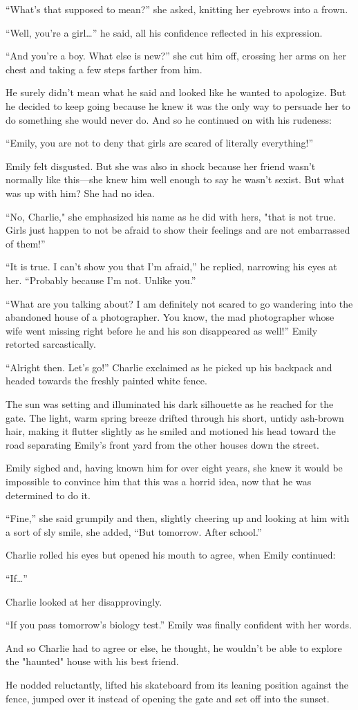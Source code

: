 “What’s that supposed to mean?” she asked, knitting her eyebrows into a frown.

“Well, you’re a girl…” he said, all his confidence reflected in his expression.

“And you’re a boy. What else is new?” she cut him off, crossing her arms on her chest and taking a few steps farther from him.

He surely didn’t mean what he said and looked like he wanted to apologize. But he decided to keep going because he knew
it was the only way to persuade her to do something she would never do. And so he continued on with his rudeness:

“Emily, you are not to deny that girls are scared of literally everything!”

Emily felt disgusted. But she was also in shock because her friend wasn’t normally like this—she knew him well enough to say he wasn’t sexist.
But what was up with him? She had no idea.

“No, Charlie," she emphasized his name as he did with hers, "that is not true. Girls just happen to not be afraid to show their feelings and are not
embarrassed of them!”

“It is true. I can’t show you that I’m afraid,” he replied, narrowing his eyes at her. “Probably because I’m not. Unlike you.”

“What are you talking about? I am definitely not scared to go wandering into the abandoned house of a photographer. You know, the mad photographer
whose wife went missing right before he and his son disappeared as well!” Emily retorted sarcastically.

“Alright then. Let’s go!” Charlie exclaimed as he picked up his backpack and headed towards the freshly painted white fence.

The sun was setting and illuminated his dark silhouette as he reached for the gate. The light, warm spring breeze drifted
through his short, untidy ash-brown hair, making it flutter slightly as he smiled and motioned his head toward the road
separating Emily’s front yard from the other houses down the street.

Emily sighed and, having known him for over eight years, she knew it would be impossible to convince him that this was a horrid idea, now
that he was determined to do it.

“Fine,” she said grumpily and then, slightly cheering up and looking at him with a sort of sly smile, she added, “But tomorrow. After school.”

Charlie rolled his eyes but opened his mouth to agree, when Emily continued:

“If…”

Charlie looked at her disapprovingly.

“If you pass tomorrow’s biology test.” Emily was finally confident with her words.

And so Charlie had to agree or else, he thought, he wouldn’t be able to explore the "haunted" house with his best friend.

He nodded reluctantly, lifted his skateboard from its leaning position against the fence,
jumped over it instead of opening the gate and set off into the sunset.